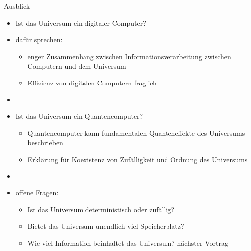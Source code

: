 \documentclass[aspectratio=1610, 9pt]{beamer}
\begin{document}
\begin{frame}{Ausblick}
  \begin{itemize}
    \item Ist das Universum ein digitaler Computer?
    \item dafür sprechen:
    \begin{itemize}
      \item enger Zusammenhang zwischen Informationsverarbeitung zwischen Computern und dem Universum
      \item Effizienz von digitalen Computern fraglich
    \end{itemize}
    \item[]
    \item Ist das Universum ein Quantencomputer?
    \begin{itemize}
      \item Quantencomputer kann fundamentalen Quanteneffekte des Universums beschrieben
      \item Erklärung für Koexistenz von Zufälligkeit und Ordnung des Universums
    \end{itemize}
    \item[]
    \item offene Fragen:
    \begin{itemize}
      \item Ist das Universum deterministisch oder zufällig?
      \item Bietet das Universum unendlich viel Speicherplatz?
      \item Wie viel Information beinhaltet das Universum? \rightarrow nächster Vortrag
    \end{itemize}
  \end{itemize}
\end{frame}
\end{document}
